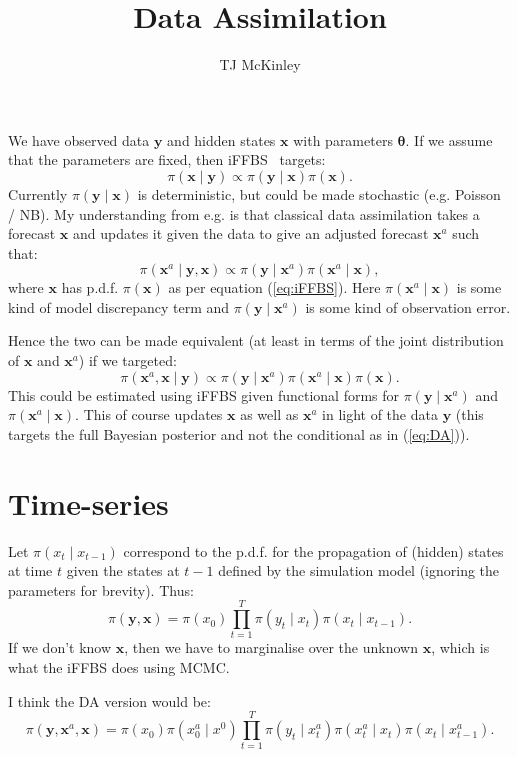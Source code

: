 \documentclass[a4paper]{article}
\title{Data Assimilation}
\author{TJ McKinley}
\date{}
\newcommand{\btheta}{\bm{\theta}}
\newcommand{\bx}{\bm{x}}
\newcommand{\by}{\bm{y}}
\begin{document}
\maketitle

We have observed data $\by$ and hidden states $\bx$ with parameters $\btheta$. If we assume that the parameters are fixed, then iFFBS~\citep{touloupouetal:2020} targets:
\begin{equation}
    \pi\left(\bx \mid \by\right) \propto \pi\left(\by \mid \bx\right)\pi\left(\bx\right). \label{eq:iFFBS}
\end{equation}
Currently $\pi\left(\by \mid \bx\right)$ is deterministic, but could be made stochastic (e.g. Poisson / NB). My understanding from e.g. \cite{lahoz_schneider:2014} is that classical data assimilation takes a forecast $\bx$ and updates it given the data to give an adjusted forecast $\bx^a$ such that:
\begin{equation}
    \pi\left(\bx^a \mid \by, \bx\right) \propto \pi\left(\by \mid \bx^a\right)\pi\left(\bx^a \mid \bx\right), \label{eq:DA}
\end{equation}
where $\bx$ has p.d.f. $\pi\left(\bx\right)$ as per equation (\ref{eq:iFFBS}). Here $\pi\left(\bx^a \mid \bx\right)$ is some kind of model discrepancy term and $\pi\left(\by \mid \bx^a\right)$ is some kind of observation error. 

Hence the two can be made equivalent (at least in terms of the joint distribution of $\bx$ and $\bx^a$) if we targeted:
\begin{equation}
    \pi\left(\bx^a, \bx \mid \by\right) \propto \pi\left(\by \mid \bx^a\right)\pi\left(\bx^a \mid \bx\right)\pi\left(\bx\right). \label{eq:joint}
\end{equation}
This could be estimated using iFFBS given functional forms for $\pi\left(\by \mid \bx^a\right)$ and $\pi\left(\bx^a \mid \bx\right)$. This of course updates $\bx$ as well as $\bx^a$ in light of the data $\by$ (this targets the full Bayesian posterior and not the conditional as in (\ref{eq:DA})).

\section{Time-series}
Let $\pi\left(x_t \mid x_{t-1}\right)$ correspond to the p.d.f. for the propagation of (hidden) states at time $t$ given the states at $t-1$ defined by the simulation model (ignoring the parameters for brevity). Thus:
\begin{equation}
    \pi\left(\by, \bx\right) = \pi\left(x_0\right)\prod_{t=1}^T \pi\left(y_t \mid x_t\right)\pi\left(x_t \mid x_{t - 1}\right).
\end{equation}
If we don't know $\bx$, then we have to marginalise over the unknown $\bx$, which is what the iFFBS does using MCMC.

I think the DA version would be:
\begin{equation}
    \pi\left(\by, \bx^a, \bx\right) = \pi\left(x_0\right)\pi\left(x_0^a \mid x^0\right)\prod_{t=1}^T \pi\left(y_t \mid x_t^a\right)\pi\left(x_t^a \mid x_t\right)\pi\left(x_t \mid x^a_{t - 1}\right).
\end{equation}


\end{document}
